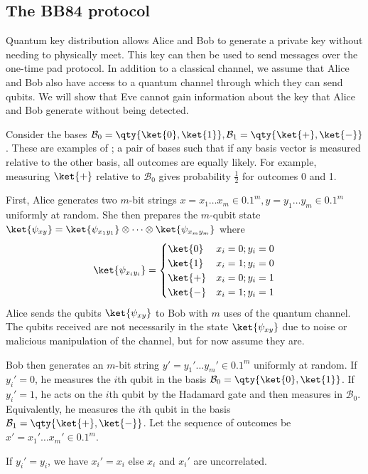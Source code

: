 \subsection{The BB84 protocol}
Quantum key distribution allows Alice and Bob to generate a private key without needing to physically meet.
This key can then be used to send messages over the one-time pad protocol.
In addition to a classical channel, we assume that Alice and Bob also have access to a quantum channel through which they can send qubits.
We will show that Eve cannot gain information about the key that Alice and Bob generate without being detected.

Consider the bases $\mathcal B_0 = \qty{\ket{0}, \ket{1}}, \mathcal B_1 = \qty{\ket{+}, \ket{-}}$.
These are examples of ; a pair of bases such that if any basis vector is measured relative to the other basis, all outcomes are equally likely.
For example, measuring $\ket{+}$ relative to $\mathcal B_0$ gives probability $\frac{1}{2}$ for outcomes 0 and 1.

First, Alice generates two $m$-bit strings $x = x_1 \dots x_m \in \qty{0,1}^m, y = y_1 \dots y_m \in \qty{0,1}^m$ uniformly at random.
She then prepares the $m$-qubit state $\ket{\psi_{xy}} = \ket{\psi_{x_1 y_1}} \otimes \dots \otimes \ket{\psi_{x_m y_m}}$ where
\[ \ket{\psi_{x_i y_i}} = \begin{cases}
    \ket{0} & x_i = 0; y_i = 0 \\
    \ket{1} & x_i = 1; y_i = 0 \\
    \ket{+} & x_i = 0; y_i = 1 \\
    \ket{-} & x_i = 1; y_i = 1
\end{cases} \]
Alice sends the qubits $\ket{\psi_{xy}}$ to Bob with $m$ uses of the quantum channel.
The qubits received are not necessarily in the state $\ket{\psi_{xy}}$ due to noise or malicious manipulation of the channel, but for now assume they are.

Bob then generates an $m$-bit string $y' = y_1' \dots y_m' \in \qty{0,1}^m$ uniformly at random.
If $y_i' = 0$, he measures the $i$th qubit in the basis $\mathcal B_0 = \qty{\ket{0}, \ket{1}}$.
If $y_i' = 1$, he acts on the $i$th qubit by the Hadamard gate and then measures in $\mathcal B_0$.
Equivalently, he measures the $i$th qubit in the basis $\mathcal B_1 = \qty{\ket{+}, \ket{-}}$.
Let the sequence of outcomes be $x' = x_1' \dots x_m' \in \qty{0,1}^m$.

If $y_i' = y_i$, we have $x_i' = x_i$ else $x_i$ and $x_i'$ are uncorrelated.

